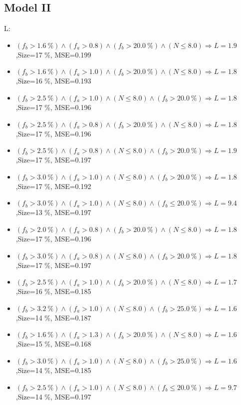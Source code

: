 \documentclass[numbered]{CSL}
\begin{document}
\subsection{Model II}
L:
\begin{itemize}
\item $(f_b > 1.6~\%) \land (f_a > 0.8) \land (f_b > 20.0~\%) \land (N \leq 8.0) \Rightarrow L = 1.9$,\hfill Size=17 \%, MSE=0.199
\item $(f_b > 1.6~\%) \land (f_a > 1.0) \land (f_b > 20.0~\%) \land (N \leq 8.0) \Rightarrow L = 1.8$,\hfill Size=16 \%, MSE=0.193
\item $(f_b > 2.5~\%) \land (f_a > 1.0) \land (N \leq 8.0) \land (f_b > 20.0~\%) \Rightarrow L = 1.8$,\hfill Size=17 \%, MSE=0.196
\item $(f_b > 2.5~\%) \land (f_a > 0.8) \land (f_b > 20.0~\%) \land (N \leq 8.0) \Rightarrow L = 1.8$,\hfill Size=17 \%, MSE=0.196
\item $(f_b > 2.5~\%) \land (f_a > 0.8) \land (N \leq 8.0) \land (f_b > 20.0~\%) \Rightarrow L = 1.9$,\hfill Size=17 \%, MSE=0.197
\item $(f_b > 3.0~\%) \land (f_a > 1.0) \land (N \leq 8.0) \land (f_b > 20.0~\%) \Rightarrow L = 1.8$,\hfill Size=17 \%, MSE=0.192
\item $(f_b > 3.0~\%) \land (f_a > 1.0) \land (N \leq 8.0) \land (f_b \leq 20.0~\%) \Rightarrow L = 9.4$,\hfill Size=13 \%, MSE=0.197
\item $(f_b > 2.0~\%) \land (f_a > 0.8) \land (f_b > 20.0~\%) \land (N \leq 8.0) \Rightarrow L = 1.8$,\hfill Size=17 \%, MSE=0.196
\item $(f_b > 3.0~\%) \land (f_a > 0.8) \land (N \leq 8.0) \land (f_b > 20.0~\%) \Rightarrow L = 1.8$,\hfill Size=17 \%, MSE=0.197
\item $(f_b > 2.5~\%) \land (f_a > 1.0) \land (f_b > 20.0~\%) \land (N \leq 8.0) \Rightarrow L = 1.7$,\hfill Size=16 \%, MSE=0.185
\item $(f_b > 3.2~\%) \land (f_a > 1.0) \land (N \leq 8.0) \land (f_b > 25.0~\%) \Rightarrow L = 1.6$,\hfill Size=14 \%, MSE=0.187
\item $(f_b > 1.6~\%) \land (f_a > 1.3) \land (f_b > 20.0~\%) \land (N \leq 8.0) \Rightarrow L = 1.6$,\hfill Size=15 \%, MSE=0.168
\item $(f_b > 3.0~\%) \land (f_a > 1.0) \land (N \leq 8.0) \land (f_b > 25.0~\%) \Rightarrow L = 1.6$,\hfill Size=14 \%, MSE=0.185
\item $(f_b > 2.5~\%) \land (f_a > 1.0) \land (N \leq 8.0) \land (f_b \leq 20.0~\%) \Rightarrow L = 9.7$,\hfill Size=14 \%, MSE=0.197

\end{itemize}
\end{document}
